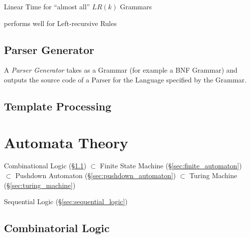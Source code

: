 Linear Time for ``almost all'' $LR(k)$ Grammars %

performs well for Left-recursive Rules



\subsection{Parser Generator}\label{sec:parser_generator}

A \emph{Parser Generator} takes as a Grammar (for example a BNF
Grammar) and outputs the source code of a Parser for the Language
specified by the Grammar.



\subsection{Template Processing}\label{sec:template_processing}



\section{Automata Theory}\label{sec:automata_theory}


Combinational Logic (\S\ref{sec:combinatorial_logic})
$\subset$ Finite State Machine (\S\ref{sec:finite_automaton})
$\subset$ Pushdown Automaton (\S\ref{sec:pushdown_automaton})
$\subset$ Turing Machine (\S\ref{sec:turing_machine})

Sequential Logic (\S\ref{sec:sequential_logic})




\subsection{Combinatorial Logic}\label{sec:combinatorial_logic}

